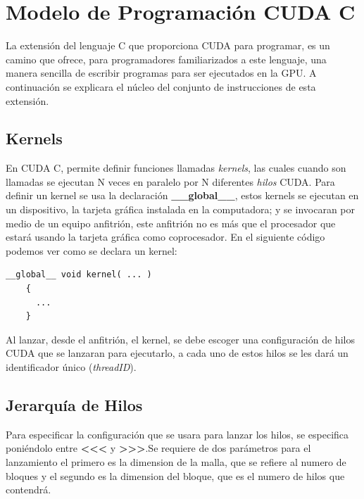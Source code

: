 \section{Modelo de Programación CUDA C}
La extensión del lenguaje C que proporciona CUDA para programar, es un camino que ofrece, para programadores familiarizados a este lenguaje, una manera sencilla de escribir programas para ser ejecutados en la GPU. A continuación se explicara el núcleo del conjunto de instrucciones de esta extensión.
\subsection{Kernels}

En CUDA C, permite definir funciones llamadas \textit{kernels}, las cuales cuando son llamadas se ejecutan N veces en paralelo por N diferentes \textit{hilos} CUDA. Para definir un kernel se usa la declaración \textbf{\_\_global\_\_}, estos kernels se ejecutan en un dispositivo, la tarjeta gráfica instalada en la computadora; y se invocaran por medio de un equipo anfitrión, este anfitrión no es más que el procesador que estará usando la tarjeta gráfica como coprocesador. En el siguiente código podemos ver como se declara un kernel: 

\begin{lstlisting}[caption=Declaración de un Kernel en CUDA C.]
	__global__ void kernel( ... )
    {
   	  ...
    }

\end{lstlisting}

Al lanzar, desde el anfitrión, el kernel, se debe escoger una configuración de hilos CUDA que se lanzaran para ejecutarlo, a cada uno de estos hilos se les dará un identificador único (\textit{threadID}). 

\subsection{Jerarquía de Hilos}

Para especificar la configuración que se usara para lanzar los hilos, se especifica poniéndolo entre \textbf{\textless\textless\textless} y \textbf{\textgreater\textgreater\textgreater}.Se requiere de dos parámetros para el lanzamiento el primero es la dimension de la malla, que se refiere al numero de bloques y el segundo es la dimension del bloque, que es el numero de hilos que contendrá. 


